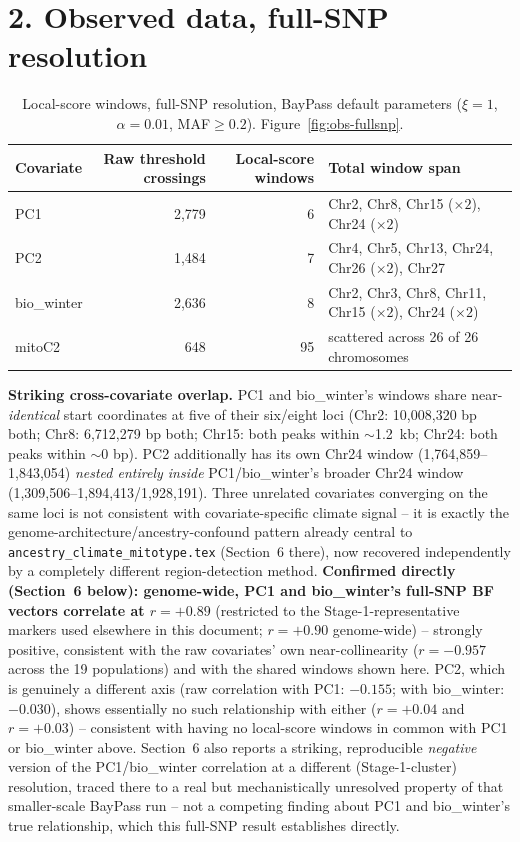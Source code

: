 \documentclass[11pt]{article}
\begin{document}
\section*{\color{Accent}2. Observed data, full-SNP resolution}
\begin{table}[H]\centering\small
\begin{tabular}{lrrl}
\toprule
Covariate & Raw threshold crossings & Local-score windows & Total window span \\
\midrule
PC1        & 2{,}779 & 6  & Chr2, Chr8, Chr15 ($\times2$), Chr24 ($\times2$) \\
PC2        & 1{,}484 & 7  & Chr4, Chr5, Chr13, Chr24, Chr26 ($\times2$), Chr27 \\
bio\_winter & 2{,}636 & 8  & Chr2, Chr3, Chr8, Chr11, Chr15 ($\times2$), Chr24 ($\times2$) \\
mitoC2      & 648     & 95 & scattered across 26 of 26 chromosomes \\
\bottomrule
\end{tabular}
\caption{Local-score windows, full-SNP resolution, BayPass default parameters
($\xi=1$, $\alpha=0.01$, MAF$\geq0.2$). Figure~\ref{fig:obs-fullsnp}.}
\end{table}

\textbf{Striking cross-covariate overlap.} PC1 and bio\_winter's windows share
near-\emph{identical} start coordinates at five of their six/eight loci (Chr2: 10{,}008{,}320
bp both; Chr8: 6{,}712{,}279 bp both; Chr15: both peaks within $\sim$1.2~kb; Chr24: both peaks
within $\sim$0 bp). PC2 additionally has its own Chr24 window (1{,}764{,}859--1{,}843{,}054)
\emph{nested entirely inside} PC1/bio\_winter's broader Chr24 window
(1{,}309{,}506--1{,}894{,}413/1{,}928{,}191). Three unrelated covariates converging on the same
loci is not consistent with covariate-specific climate signal -- it is exactly the
genome-architecture/ancestry-confound pattern already central to
\texttt{ancestry\_climate\_mitotype.tex} (Section~6 there), now recovered independently by a
completely different region-detection method. \textbf{Confirmed directly (Section~6
below): genome-wide, PC1 and bio\_winter's full-SNP BF vectors correlate at $r=+0.89$}
(restricted to the Stage-1-representative markers used elsewhere in this document; $r=+0.90$
genome-wide) -- strongly positive, consistent with the raw covariates' own near-collinearity
($r=-0.957$ across the 19 populations) and with the shared windows shown here. PC2, which is
genuinely a different axis (raw correlation with PC1: $-0.155$; with bio\_winter: $-0.030$),
shows essentially no such relationship with either ($r=+0.04$ and $r=+0.03$) -- consistent
with having no local-score windows in common with PC1 or bio\_winter above. Section~6 also
reports a striking, reproducible \emph{negative} version of the PC1/bio\_winter correlation
at a different (Stage-1-cluster) resolution, traced there to a real but mechanistically
unresolved property of that smaller-scale BayPass run -- not a competing finding about
PC1 and bio\_winter's true relationship, which this full-SNP result establishes directly.
\end{document}
